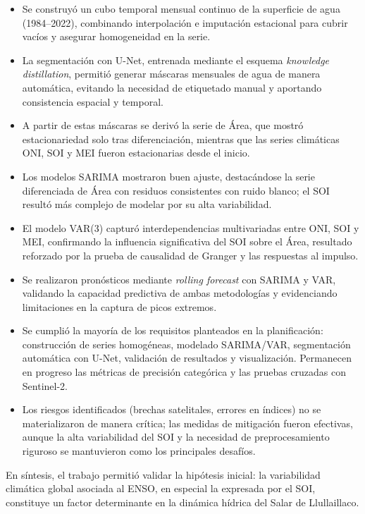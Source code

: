 \begin{itemize}
    \item Se construyó un cubo temporal mensual continuo de la superficie de agua (1984--2022), combinando interpolación e imputación estacional para cubrir vacíos y asegurar homogeneidad en la serie.
    \item La segmentación con U-Net, entrenada mediante el esquema \emph{knowledge distillation}, permitió generar máscaras mensuales de agua de manera automática, evitando la necesidad de etiquetado manual y aportando consistencia espacial y temporal.
    \item A partir de estas máscaras se derivó la serie de Área, que mostró estacionariedad solo tras diferenciación, mientras que las series climáticas ONI, SOI y MEI fueron estacionarias desde el inicio.
    \item Los modelos SARIMA mostraron buen ajuste, destacándose la serie diferenciada de Área con residuos consistentes con ruido blanco; el SOI resultó más complejo de modelar por su alta variabilidad.
    \item El modelo VAR(3) capturó interdependencias multivariadas entre ONI, SOI y MEI, confirmando la influencia significativa del SOI sobre el Área, resultado reforzado por la prueba de causalidad de Granger y las respuestas al impulso.
    \item Se realizaron pronósticos mediante \emph{rolling forecast} con SARIMA y VAR, validando la capacidad predictiva de ambas metodologías y evidenciando limitaciones en la captura de picos extremos.
    \item Se cumplió la mayoría de los requisitos planteados en la planificación: construcción de series homogéneas, modelado SARIMA/VAR, segmentación automática con U-Net, validación de resultados y visualización. Permanecen en progreso las métricas de precisión categórica y las pruebas cruzadas con Sentinel-2.
    \item Los riesgos identificados (brechas satelitales, errores en índices) no se materializaron de manera crítica; las medidas de mitigación fueron efectivas, aunque la alta variabilidad del SOI y la necesidad de preprocesamiento riguroso se mantuvieron como los principales desafíos.
\end{itemize}


En síntesis, el trabajo permitió validar la hipótesis inicial: la variabilidad climática global asociada al ENSO, en especial la expresada por el SOI, constituye un factor determinante en la dinámica hídrica del Salar de Llullaillaco.

